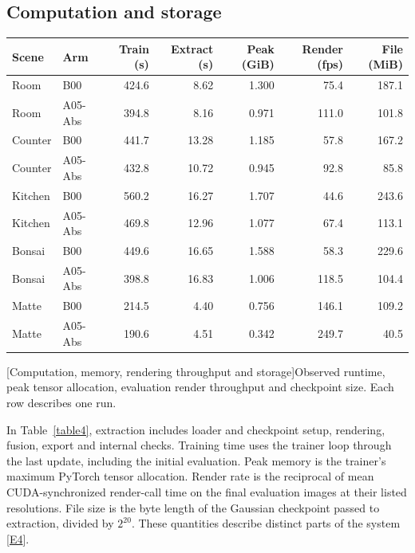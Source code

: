\documentclass[11pt,a4paper]{article}
\begin{document}
\subsection{Computation and storage}
\begin{center}\begin{minipage}{\linewidth}
\centering\small\setlength{\tabcolsep}{4pt}
\begin{tabular*}{\linewidth}{@{\extracolsep{\fill}}llrrrrr@{}}
\toprule
\textbf{Scene} & \textbf{Arm} & \textbf{Train (s)} & \textbf{Extract (s)} & \textbf{Peak (GiB)} & \textbf{Render (fps)} & \textbf{File (MiB)} \\
\midrule
Room & B00 & 424.6 & 8.62 & 1.300 & 75.4 & 187.1 \\
Room & A05-Abs & 394.8 & 8.16 & 0.971 & 111.0 & 101.8 \\
\addlinespace[2pt]
Counter & B00 & 441.7 & 13.28 & 1.185 & 57.8 & 167.2 \\
Counter & A05-Abs & 432.8 & 10.72 & 0.945 & 92.8 & 85.8 \\
\addlinespace[2pt]
Kitchen & B00 & 560.2 & 16.27 & 1.707 & 44.6 & 243.6 \\
Kitchen & A05-Abs & 469.8 & 12.96 & 1.077 & 67.4 & 113.1 \\
\addlinespace[2pt]
Bonsai & B00 & 449.6 & 16.65 & 1.588 & 58.3 & 229.6 \\
Bonsai & A05-Abs & 398.8 & 16.83 & 1.006 & 118.5 & 104.4 \\
\addlinespace[2pt]
Matte & B00 & 214.5 & 4.40 & 0.756 & 146.1 & 109.2 \\
Matte & A05-Abs & 190.6 & 4.51 & 0.342 & 249.7 & 40.5 \\
\bottomrule
\end{tabular*}\par
{}[Computation, memory, rendering throughput and storage]{Observed runtime, peak tensor allocation, evaluation render throughput and checkpoint size. Each row describes one run.}\label{table4}
\end{minipage}\end{center}
In Table~\ref{table4}, extraction includes loader and checkpoint setup, rendering, fusion, export and internal checks. Training time uses the trainer loop through the last update, including the initial evaluation. Peak memory is the trainer's maximum PyTorch tensor allocation. Render rate is the reciprocal of mean CUDA-synchronized render-call time on the final evaluation images at their listed resolutions. File size is the byte length of the Gaussian checkpoint passed to extraction, divided by $2^{20}$. These quantities describe distinct parts of the system [\hyperlink{evE4}{E4}].\par
\end{document}
